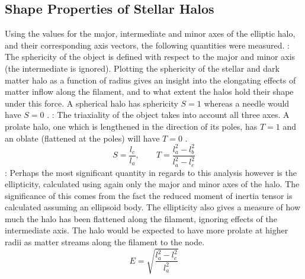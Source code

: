 \documentclass[journal]{IEEEtran}
\begin{document}
\subsection{Shape Properties of Stellar Halos}
Using the values for the major, intermediate and minor axes of the elliptic halo, and their corresponding axis vectors, the following quantities were measured. 
: The sphericity of the object is defined with respect to the major and minor axis (the intermediate is ignored). Plotting the sphericity of the stellar and dark matter halo as a function of radius gives an insight into the elongating effects of matter inflow along the filament, and to what extent the halos hold their shape under this force. A spherical halo has sphericity $S=1$ whereas a needle would have $S=0$ \cite{hahn07a}.
: The triaxiality of the object takes into account all three axes. A prolate halo, one which is lengthened in the direction of its poles, has $T=1$ and an oblate (flattened at the poles) will have $T=0$ \cite{hahn07a}.
\begin{equation}
	S=\frac{l_c}{l_a}, \quad \quad T=\frac{l_a^2-l_b^2}{l_a^2-l_c^2}
	\label{eq:sph&tri}
\end{equation}
: Perhaps the most significant quantity in regards to this analysis however is the ellipticity, calculated using again only the major and minor axes of the halo. The significance of this comes from the fact the reduced moment of inertia tensor is calculated assuming an ellipsoid body. The ellipticity also gives a measure of how much the halo has been flattened along the filament, ignoring effects of the intermediate axis. The halo would be expected to have more prolate at higher radii as matter streams along the filament to the node.
\begin{equation}
	E=\sqrt{\frac{l_a^2-l_c^2}{l_a^2}}
	\label{eq:ellipticity}
\end{equation}
\end{document}
